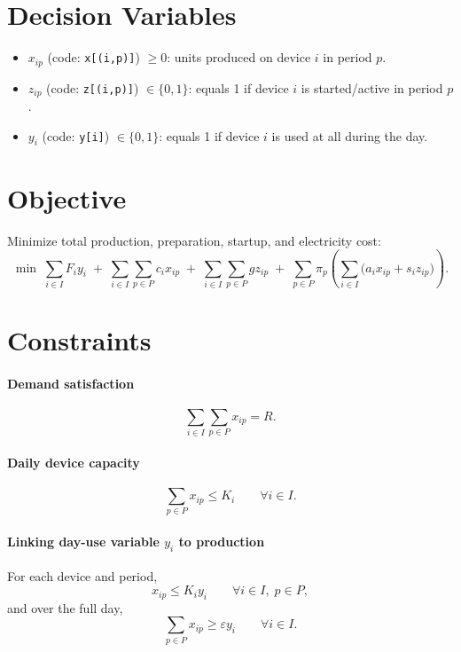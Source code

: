 \section*{Decision Variables}

\begin{itemize}
    \item \(x_{ip}\) (code: \texttt{x[(i,p)]}) \(\ge 0\): units produced on device \(i\) in period \(p\).
    \item \(z_{ip}\) (code: \texttt{z[(i,p)]}) \(\in \{0,1\}\): equals 1 if device \(i\) is started/active in period \(p\).
    \item \(y_i\) (code: \texttt{y[i]}) \(\in \{0,1\}\): equals 1 if device \(i\) is used at all during the day.
\end{itemize}

\section*{Objective}

Minimize total production, preparation, startup, and electricity cost:
\[
\min \;
\sum_{i\in I} F_i y_i
\;+\;
\sum_{i\in I}\sum_{p\in P} c_i x_{ip}
\;+\;
\sum_{i\in I}\sum_{p\in P} g z_{ip}
\;+\;
\sum_{p\in P}\pi_p
\left(
\sum_{i\in I} \bigl(a_i x_{ip}+s_i z_{ip}\bigr)
\right).
\]

\section*{Constraints}

\paragraph{Demand satisfaction}
\[
\sum_{i\in I}\sum_{p\in P} x_{ip} = R.
\]

\paragraph{Daily device capacity}
\[
\sum_{p\in P} x_{ip} \le K_i
\qquad \forall i\in I.
\]

\paragraph{Linking day-use variable \(y_i\) to production}
For each device and period,
\[
x_{ip} \le K_i y_i
\qquad \forall i\in I,\; p\in P,
\]
and over the full day,
\[
\sum_{p\in P} x_{ip} \ge \varepsilon y_i
\qquad \forall i\in I.
\]

